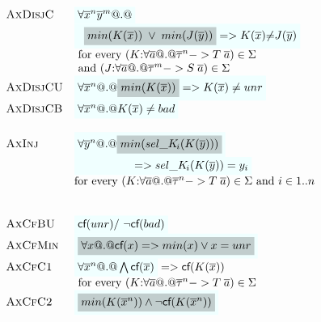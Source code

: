 \begin{figure}
{\[\begin{array}{c}
\begin{array}{lll}
 \textsc{AxDisjC} & \formula{\forall \oln{x}{n}\oln{y}{m} @.@} \\ 
                  & \formula{\;\;\highlight{min(K(\ol{x}))\;\lor\;min(J(\ol{y}))} =>
                                  K(\ol{x}){\neq}J(\ol{y})} \\
                  & \text{ for every } (K{:}\forall\as @.@ \oln{\tau}{n} -> T\;\as) \in \Sigma \\ 
                  & \text{ and } (J{:}\forall\as @.@ \oln{\tau}{m} -> S\;\as) \in \Sigma \\
 \textsc{AxDisjCU} & \formula{\forall \oln{x}{n} @.@ \highlight{min(K(\ol{x}))} => K(\ol{x}) \neq unr} \\
 \textsc{AxDisjCB} & \formula{\forall \oln{x}{n} @.@ K(\ol{x}) \neq \bad} \\ \\ 
 \textsc{AxInj}   & \formula{\forall \oln{y}{n} @.@ \highlight{min(\sel{K}{i}(K(\ys)))}} \\ %
                  & \formula{\quad\qquad\qquad => \sel{K}{i}(K(\ys)) = y_i} \\ 
                  & \text{for every } (K{:}\forall\as @.@ \oln{\tau}{n} -> T\;\as) \in \Sigma \text{ and } i \in 1..n  \\ \\ \\ 
 \textsc{AxCfBU}  & \formula{\lcf{\unr} /\ \lncf{\bad}} \\
 \textsc{AxCfMin} & \formula{\highlight{\forall x @.@ \lcf{x} => min(x) \lor x = unr}} \\
 \textsc{AxCfC1} & \formula{\forall \oln{x}{n} @.@ \bigwedge\lcf{\ol{x}}} => \lcf{K(\ol{x})} \\
                 & \text{ for every } (K{:}\forall\as @.@ \oln{\tau}{n} -> T\;\as) \in \Sigma \\
 \textsc{AxCfC2} & \formula{\highlight{min(K(\oln{x}{n}))\land\neg\lcf{K(\oln{x}{n})}}} \\ 

\end{array}
\end{array}\]}
\end{figure}
